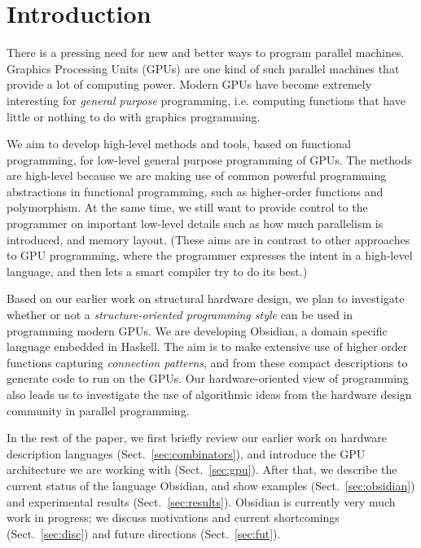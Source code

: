 \section{Introduction}

There is a pressing need for new and better ways to program parallel
machines. Graphics Processing Units (GPUs) are one kind of such parallel
machines that provide a lot of computing power. Modern GPUs have become
extremely interesting for {\em general purpose} programming, i.e. computing
functions that have little or nothing to do with graphics programming.

We aim to develop high-level methods and tools, based on functional
programming, for low-level general purpose programming of GPUs. The methods
are high-level because we are making use of common powerful programming
abstractions in functional programming, such as higher-order functions and
polymorphism. At the same time, we still want to provide control to the
programmer on important low-level details such as how much parallelism is
introduced, and memory layout. (These aims are in contrast to other
approaches to GPU programming, where the programmer expresses the intent in
a high-level language, and then lets a smart compiler try to do its best.)

Based on our earlier work on structural hardware design, we plan to
investigate whether or not a {\em structure-oriented programming style} can
be used in programming modern GPUs. We are developing Obsidian, a domain
specific language embedded in Haskell. The aim is to make extensive use of
higher order functions capturing {\em connection patterns}, and from these
compact descriptions to generate code to run on the GPUs. Our
hardware-oriented view of programming also leads us to investigate the use
of algorithmic ideas from the hardware design community in parallel
programming.

In the rest of the paper, we first briefly review our earlier work on
hardware description languages (Sect.\ \ref{sec:combinators}), and introduce
the GPU architecture we are working with (Sect.\ \ref{sec:gpu}). After
that, we describe the current status of the language Obsidian, and show
examples (Sect.\ \ref{sec:obsidian}) and experimental results (Sect.\
\ref{sec:results}). Obsidian is currently very much work in progress; we
discuss motivations and current shortcomings (Sect.\ \ref{sec:disc}) and
future directions (Sect.\ \ref{sec:fut}).
